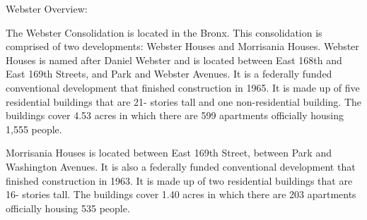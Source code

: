 Webster Overview:      

    

The Webster Consolidation is located in the Bronx. This consolidation is comprised of two developments: Webster Houses and Morrisania Houses. Webster Houses is named after Daniel Webster and is located between East 168th and East 169th Streets, and Park and Webster Avenues. It is a federally funded conventional development that finished construction in 1965. It is made up of five residential buildings that are 21- stories tall and one non-residential building. The buildings cover 4.53 acres in which there are 599 apartments officially housing 1,555 people.  



Morrisania Houses is located between East 169th Street, between Park and Washington Avenues. It is also a federally funded conventional development that finished construction in 1963.  It is made up of two residential buildings that are 16- stories tall. The buildings cover 1.40 acres in which there are 203 apartments officially housing 535 people.